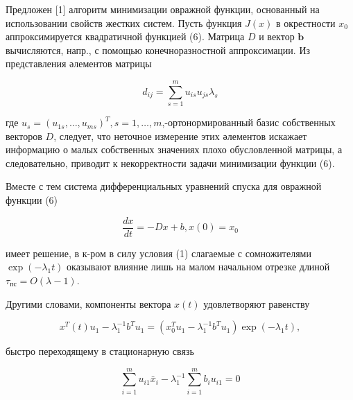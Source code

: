\documentclass[10pt]{article}
\begin{document}
Предложен [1] алгоритм минимизации овражной функции, основанный на использовании свойств жестких систем. Пусть функция $J(x)$ в окрестности $x_{0}$ аппроксимируется квадратичной функцией (6). Матрица $D$ и вектор $\boldsymbol{b}$ вычисляются, напр., с помощью конечноразностной аппроксимации. Из представления әлементов матрицы



\[

d_{i j}=\sum_{s=1}^{m} u_{i s} u_{j s} \lambda_{s}

\]



где $u_{s}=\left(u_{1 s}, \ldots, u_{m s}\right)^{T}, s=1, \ldots, m$,-ортонормированный базис собственных векторов $D$, следует, что неточное измерение этих әлементов искажает информацию о малых собственных значениях плохо обусловленной матрицы, а следовательно, приводит к некорректности задачи минимизации функции (6).



Вместе с тем система дифференциальных уравнений спуска для овражной функции (6)



\[

\frac{d x}{d t}=-D x+b, x(0)=x_{0}

\]



имеет решение, в к-ром в силу условия (1) слагаемые с сомножителями $\exp \left(-\lambda_{1} t\right)$ оказывают влияние лишь на малом начальном отрезке длиной $\tau_{п с}=O(\lambda-1)$.



Другими словами, компоненты вектора $x(t)$ удовлетворяют равенству



\[

x^{T}(t) u_{1}-\lambda_{1}^{-1} b^{T} u_{1}=\left(x_{0}^{T} u_{1}-\lambda_{1}^{-1} b^{T} u_{1}\right) \exp \left(-\lambda_{1} t\right),

\]



быстро переходящему в стационарную связь



\[

\sum_{i=1}^{m} u_{i 1} \bar{x}_{i}-\lambda_{1}^{-1} \sum_{i=1}^{m} b_{i} u_{i 1}=0

\]
\end{document}

